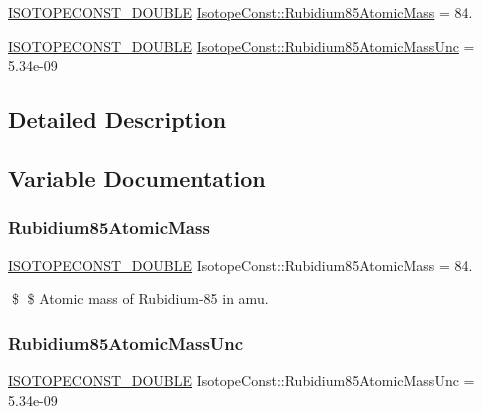 \begin{DoxyCompactItemize}
\item 
\mbox{\hyperlink{group___isotope_const-_macros_ga8f45a7272ce02c0b4c65c44636ed719a}{I\+S\+O\+T\+O\+P\+E\+C\+O\+N\+S\+T\+\_\+\+D\+O\+U\+B\+LE}} \mbox{\hyperlink{group___isotope_const-_rubidium-_rb85_gae23cd48e50fd21a2c9834efae33a177b}{Isotope\+Const\+::\+Rubidium85\+Atomic\+Mass}} = 84.
\item 
\mbox{\hyperlink{group___isotope_const-_macros_ga8f45a7272ce02c0b4c65c44636ed719a}{I\+S\+O\+T\+O\+P\+E\+C\+O\+N\+S\+T\+\_\+\+D\+O\+U\+B\+LE}} \mbox{\hyperlink{group___isotope_const-_rubidium-_rb85_ga487647b031797dc5f00ab719f51c29c9}{Isotope\+Const\+::\+Rubidium85\+Atomic\+Mass\+Unc}} = 5.\+34e-\/09
\end{DoxyCompactItemize}


\subsection{Detailed Description}


\subsection{Variable Documentation}
\mbox{\label{group___isotope_const-_rubidium-_rb85_gae23cd48e50fd21a2c9834efae33a177b}} 
\subsubsection{\texorpdfstring{Rubidium85\+Atomic\+Mass}{Rubidium85AtomicMass}}
{\footnotesize\ttfamily \mbox{\hyperlink{group___isotope_const-_macros_ga8f45a7272ce02c0b4c65c44636ed719a}{I\+S\+O\+T\+O\+P\+E\+C\+O\+N\+S\+T\+\_\+\+D\+O\+U\+B\+LE}} Isotope\+Const\+::\+Rubidium85\+Atomic\+Mass = 84.}

\$ \$ Atomic mass of Rubidium-\/85 in amu. \mbox{\label{group___isotope_const-_rubidium-_rb85_ga487647b031797dc5f00ab719f51c29c9}} 
\subsubsection{\texorpdfstring{Rubidium85\+Atomic\+Mass\+Unc}{Rubidium85AtomicMassUnc}}
{\footnotesize\ttfamily \mbox{\hyperlink{group___isotope_const-_macros_ga8f45a7272ce02c0b4c65c44636ed719a}{I\+S\+O\+T\+O\+P\+E\+C\+O\+N\+S\+T\+\_\+\+D\+O\+U\+B\+LE}} Isotope\+Const\+::\+Rubidium85\+Atomic\+Mass\+Unc = 5.\+34e-\/09}

